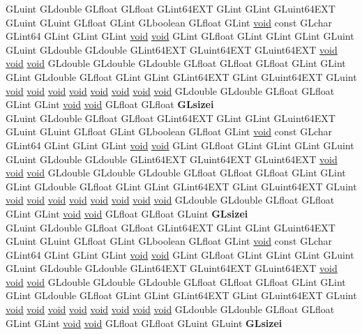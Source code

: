 \begin{DoxyCompactItemize}
\begin{tabbing}
\>GLuint GLdouble GLfloat GLfloat GLint64EXT GLint GLint GLuint64EXT GLuint GLuint GLfloat GLint GLboolean GLfloat GLint \hyperlink{interfacevoid}{void} const GLchar GLint64 GLint GLint GLint \hyperlink{interfacevoid}{void} \hyperlink{interfacevoid}{void} GLint GLfloat GLint GLint GLint GLuint GLuint GLdouble GLdouble GLint64EXT GLuint64EXT GLuint64EXT \hyperlink{interfacevoid}{void} \hyperlink{interfacevoid}{void} \hyperlink{interfacevoid}{void} GLdouble GLdouble GLdouble GLfloat GLfloat GLfloat GLint GLint GLint GLdouble GLfloat GLint GLint GLint64EXT GLint GLuint64EXT GLuint \hyperlink{interfacevoid}{void} \hyperlink{interfacevoid}{void} \hyperlink{interfacevoid}{void} \hyperlink{interfacevoid}{void} \hyperlink{interfacevoid}{void} \hyperlink{interfacevoid}{void} \hyperlink{interfacevoid}{void} \hyperlink{interfacevoid}{void} GLdouble GLdouble GLfloat GLfloat GLint GLint \hyperlink{interfacevoid}{void} \hyperlink{interfacevoid}{void} GLfloat GLfloat {\bfseries GLsizei}\\
\>GLuint GLdouble GLfloat GLfloat GLint64EXT GLint GLint GLuint64EXT GLuint GLuint GLfloat GLint GLboolean GLfloat GLint \hyperlink{interfacevoid}{void} const GLchar GLint64 GLint GLint GLint \hyperlink{interfacevoid}{void} \hyperlink{interfacevoid}{void} GLint GLfloat GLint GLint GLint GLuint GLuint GLdouble GLdouble GLint64EXT GLuint64EXT GLuint64EXT \hyperlink{interfacevoid}{void} \hyperlink{interfacevoid}{void} \hyperlink{interfacevoid}{void} GLdouble GLdouble GLdouble GLfloat GLfloat GLfloat GLint GLint GLint GLdouble GLfloat GLint GLint GLint64EXT GLint GLuint64EXT GLuint \hyperlink{interfacevoid}{void} \hyperlink{interfacevoid}{void} \hyperlink{interfacevoid}{void} \hyperlink{interfacevoid}{void} \hyperlink{interfacevoid}{void} \hyperlink{interfacevoid}{void} \hyperlink{interfacevoid}{void} \hyperlink{interfacevoid}{void} GLdouble GLdouble GLfloat GLfloat GLint GLint \hyperlink{interfacevoid}{void} \hyperlink{interfacevoid}{void} GLfloat GLfloat GLuint {\bfseries GLsizei}\\
\>GLuint GLdouble GLfloat GLfloat GLint64EXT GLint GLint GLuint64EXT GLuint GLuint GLfloat GLint GLboolean GLfloat GLint \hyperlink{interfacevoid}{void} const GLchar GLint64 GLint GLint GLint \hyperlink{interfacevoid}{void} \hyperlink{interfacevoid}{void} GLint GLfloat GLint GLint GLint GLuint GLuint GLdouble GLdouble GLint64EXT GLuint64EXT GLuint64EXT \hyperlink{interfacevoid}{void} \hyperlink{interfacevoid}{void} \hyperlink{interfacevoid}{void} GLdouble GLdouble GLdouble GLfloat GLfloat GLfloat GLint GLint GLint GLdouble GLfloat GLint GLint GLint64EXT GLint GLuint64EXT GLuint \hyperlink{interfacevoid}{void} \hyperlink{interfacevoid}{void} \hyperlink{interfacevoid}{void} \hyperlink{interfacevoid}{void} \hyperlink{interfacevoid}{void} \hyperlink{interfacevoid}{void} \hyperlink{interfacevoid}{void} \hyperlink{interfacevoid}{void} GLdouble GLdouble GLfloat GLfloat GLint GLint \hyperlink{interfacevoid}{void} \hyperlink{interfacevoid}{void} GLfloat GLfloat GLuint GLuint {\bfseries GLsizei}\\

\end{tabbing}
\end{DoxyCompactItemize}
